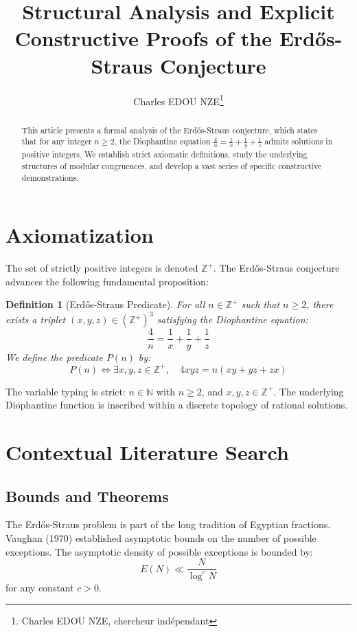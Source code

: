 \documentclass[11pt,a4paper]{article}
\title{Structural Analysis and Explicit Constructive Proofs of the Erd\H{o}s-Straus Conjecture}
\author{Charles EDOU NZE\thanks{Charles EDOU NZE, chercheur indépendant}}
\date{}
\newtheorem{definition}[theorem]{Definition}
\begin{document}
\maketitle

\begin{abstract}
This article presents a formal analysis of the Erd\H{o}s-Straus conjecture, which states that for any integer $n \geq 2$, the Diophantine equation $\frac{4}{n} = \frac{1}{x} + \frac{1}{y} + \frac{1}{z}$ admits solutions in positive integers. We establish strict axiomatic definitions, study the underlying structures of modular congruences, and develop a vast series of specific constructive demonstrations.
\end{abstract}

\tableofcontents


\section{Axiomatization}

The set of strictly positive integers is denoted $\mathbb{Z}^{+}$. The Erd\H{o}s-Straus conjecture advances the following fundamental proposition:

\begin{definition}[Erd\H{o}s-Straus Predicate]
For all $n \in \mathbb{Z}^{+}$ such that $n \geq 2$, there exists a triplet $(x, y, z) \in (\mathbb{Z}^{+})^3$ satisfying the Diophantine equation:
\begin{equation}
\frac{4}{n} = \frac{1}{x} + \frac{1}{y} + \frac{1}{z}
\label{eq:erdos}
\end{equation}
We define the predicate $P(n)$ by:
$$ P(n) \iff \exists x, y, z \in \mathbb{Z}^{+}, \quad 4xyz = n(xy + yz + zx) $$
\end{definition}

The variable typing is strict: $n \in \mathbb{N}$ with $n \geq 2$, and $x, y, z \in \mathbb{Z}^{+}$. The underlying Diophantine function is inscribed within a discrete topology of rational solutions.

\section{Contextual Literature Search}

\subsection{Bounds and Theorems}
The Erd\H{o}s-Straus problem is part of the long tradition of Egyptian fractions. Vaughan (1970) established asymptotic bounds on the number of possible exceptions. The asymptotic density of possible exceptions is bounded by:
$$ E(N) \ll \frac{N}{\log^c N} $$
for any constant $c > 0$.
\end{document}
